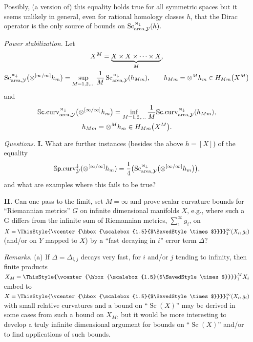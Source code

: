 \documentclass[10pt,a4paper]{amsart}
\numberwithin{equation}{section}
\newcommand\bigtimes{\mathbin{\ThisStyle{\vcenter{\hbox{%
\scalebox{1.5}{$\SavedStyle\times$}}}}}}
\begin{document}
Possibly, (a version of) this equality holds true for all symmetric spaces but it seems unlikely in general, even for rational homology classes $h$, that the Dirac operator
 is the only source of bounds on $\operatorname{Sc}^{\rtimes _\downarrow}_{{\rm area},\mathcal Y }(h).$

{\it Power stabilization.} Let
\begin{gather*}
X^M= \underset {M}{ \underbrace {X\times X\times \cdots \times X}},\\
\operatorname{Sc}^{\rtimes _\downarrow}_{{\rm area},\mathcal Y }\bigl(\otimes ^{[\infty/\infty]}h_m\bigr)=\sup_{M=1,2,\dots}\frac {1}{M} \operatorname{Sc}^{\rtimes _\downarrow}_{{\rm area},\mathcal Y }(h_{Mm}),\qquad  h_{Mm}=
\otimes^M h_m\in H_{Mm}\bigl(X^M\bigr)
\end{gather*}
and
\begin{gather*}
\mathbb S\mbox{\sf c}.{\rm curv}^{\rtimes _\downarrow}_{{\rm area},\mathcal Y }\bigl(\otimes ^{[\infty/\infty]}h_m\bigr)=\inf_{M=1,2,\dots }\frac {1}{M} \mathbb S\mbox{\sf c}.{\rm curv}^{\rtimes _\downarrow}_{{\rm area},\mathcal Y }(h_{Mm}),\\
h_{Mm}= \otimes^M h_m\in H_{Mm}\bigl(X^M\bigr).
\end{gather*}

{\it Questions.} \textbf{I.} What are further instances (besides the above $h=[X]$) of the equality
\[
\mathbb S\mbox{\sf p}.{\rm curv}^\downarrow _{\mathcal Y}(\otimes ^{[\infty/\infty]}h_m)=\frac{1}{4} \bigl(\operatorname{Sc}^{\rtimes _\downarrow}_{{\rm area},\mathcal Y }\bigl(\otimes ^{[\infty/\infty]}h_m\bigr)\bigr),
\]
and what are examples where this fails to be true?

 \textbf{II.} Can one pass to the limit, set $M=\infty$ and prove scalar curvature bounds for
``Riemannian metrics'' $G$ on infinite dimensional manifolds $X$, e.g., where such a G differs from the infinite sum of Riemannian metrics, $\sum_1^\infty g_i$, on $X=\bigtimes_1^\infty(X_i,g_i)$ (and/or on $Y$ mapped to $X$) by a ``fast decaying in
$i$'' error term $\Delta$?

 {\it Remarks.} (a) If $\Delta=\Delta_{i,j}$ decays very fast, for $i$ and/or $j$ tending to infinity, then finite products $X_M=\bigtimes_1^M X_i$ embed to
$X= \bigtimes_1^\infty(X_i,g_i)$ with small relative curvatures and a bound on ``$\operatorname{Sc}(X)$'' may be derived in some cases from such a bound on $X_M$, but it would be more interesting to develop a
 truly infinite dimensional argument for bounds on ``$\operatorname{Sc}(X)$'' and/or to find applications of such
 bounds.
\end{document}
